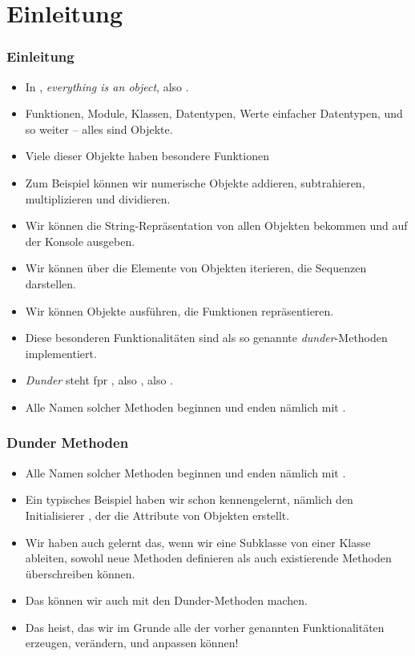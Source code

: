 \documentclass[aspectratio=169,mathserif,notheorems]{beamer}%
\subtitle{43.~Klassen/Dunder:~\texttt{\_\_str\_\_}, \texttt{\_\_repr\_\_}, und \texttt{\_\_eq\_\_}}%
\begin{document}
%
%
\startPresentation%
%
\section{Einleitung}%
\begin{frame}[t]%
\frametitle{Einleitung}%
\begin{itemize}%
%
\item In \python, \emph{everything is an object}\cite{PSF:P3D:TPLR:OVAT,J2022PPEIAOSCD}, also .%
%
\item<2-> Funktionen, Module, Klassen, Datentypen, Werte einfacher Datentypen, und so weiter -- alles sind Objekte.%
%
\item<3-> Viele dieser Objekte haben besondere Funktionen%
%
\item<4-> Zum Beispiel können wir numerische Objekte addieren, subtrahieren, multiplizieren und dividieren.%
%
\item<5-> Wir können die String-Repräsentation von allen Objekten bekommen und auf der Konsole ausgeben.%
%
\item<6-> Wir können über die Elemente von Objekten iterieren, die Sequenzen darstellen.%
%
\item<7-> Wir können Objekte ausführen, die Funktionen repräsentieren.%
%
\item<8-> Diese besonderen Funktionalitäten sind als so genannte \emph{dunder}-Methoden implementiert.%
%
\item<9-> \emph{Dunder} steht fpr , also , also \pythonilIdx{\_\_}.%
%
\item<10-> Alle Namen solcher Methoden beginnen und enden nämlich mit \pythonilIdx{\_\_}.%
%
\end{itemize}%
\end{frame}%
%
%
\begin{frame}[t]%
\frametitle{Dunder Methoden}%
\begin{itemize}%
\item Alle Namen solcher Methoden beginnen und enden nämlich mit \pythonilIdx{\_\_}.%
%
\item<2-> Ein typisches Beispiel haben wir schon kennengelernt, nämlich den Initialisierer , der die Attribute von Objekten erstellt.%
%
\item<3-> Wir haben auch gelernt das, wenn wir eine Subklasse von einer Klasse ableiten, sowohl neue Methoden definieren als auch existierende Methoden überschreiben können.%
%
\item<4-> Das können wir auch mit den Dunder-Methoden machen.%
%
\item<5-> Das heist, das wir im Grunde alle der vorher genannten Funktionalitäten erzeugen, verändern, und anpassen können!%
\end{itemize}%
\end{frame}%
%
\end{document}
